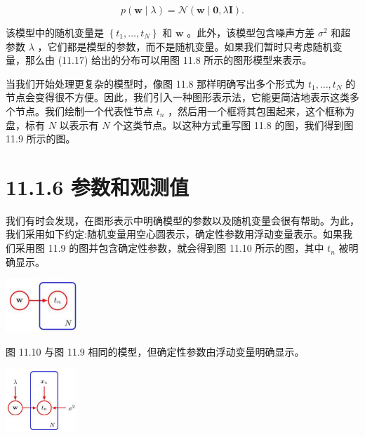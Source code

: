 \documentclass[10pt]{report}
\begin{document}
\[
p\left( {\mathbf{w} \mid  \lambda }\right)  = \mathcal{N}\left( {\mathbf{w} \mid  \mathbf{0},\lambda \mathbf{I}}\right) . \tag{11.18}
\]

该模型中的随机变量是 \(\left\{  {{t}_{1},\ldots ,{t}_{N}}\right\}\) 和 \(\mathbf{w}\) 。此外，该模型包含噪声方差 \({\sigma }^{2}\) 和超参数 \(\lambda\) ，它们都是模型的参数，而不是随机变量。如果我们暂时只考虑随机变量，那么由 (11.17) 给出的分布可以用图 11.8 所示的图形模型来表示。

当我们开始处理更复杂的模型时，像图 11.8 那样明确写出多个形式为 \({t}_{1},\ldots ,{t}_{N}\) 的节点会变得很不方便。因此，我们引入一种图形表示法，它能更简洁地表示这类多个节点。我们绘制一个代表性节点 \({t}_{n}\) ，然后用一个框将其包围起来，这个框称为盘，标有 \(N\) 以表示有 \(N\) 个这类节点。以这种方式重写图 11.8 的图，我们得到图 11.9 所示的图。

\section*{11.1.6 参数和观测值}

我们有时会发现，在图形表示中明确模型的参数以及随机变量会很有帮助。为此，我们采用如下约定:随机变量用空心圆表示，确定性参数用浮动变量表示。如果我们采用图 11.9 的图并包含确定性参数，就会得到图 11.10 所示的图，其中 \({t}_{n}\) 被明确显示。

\begin{center}
\includegraphics[max width=0.2\textwidth]{images/0194e279-9b28-703a-88f4-c3ac21e2010d_353_1306_1801_242_182_0.jpg}
\end{center}
\hspace*{3em} 

图 11.10 与图 11.9 相同的模型，但确定性参数由浮动变量明确显示。

\begin{center}
\includegraphics[max width=0.2\textwidth]{images/0194e279-9b28-703a-88f4-c3ac21e2010d_354_1223_344_318_284_0.jpg}
\end{center}
\hspace*{3em} 
\end{document}
